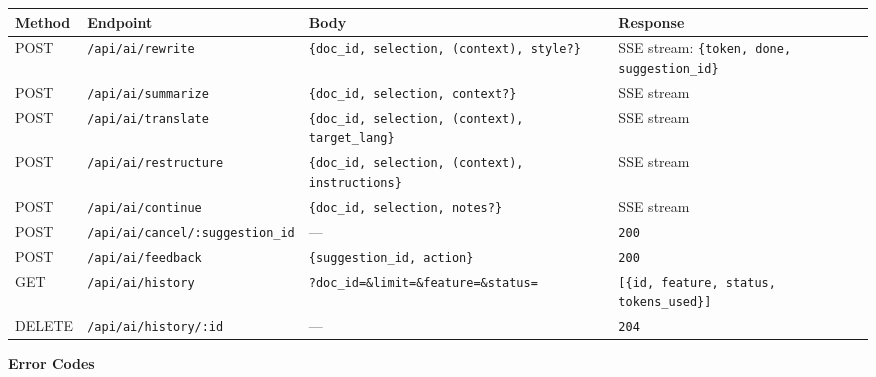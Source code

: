 \documentclass{article}
\begin{document}
\noindent
{\small
\begin{tabularx}{\textwidth}{|>{\hsize=0.3\hsize\raggedright\arraybackslash}X|>{\hsize=0.7\hsize\raggedright\arraybackslash}X|>{\hsize=0.6\hsize\raggedright\arraybackslash}X|>{\hsize=0.4\hsize\raggedright\arraybackslash}X|}
    \hline
    \rowcolor{tableBlue}
    \textbf{\color{white}Method} &
    \textbf{\color{white}Endpoint} &
    \textbf{\color{white}Body} &
    \textbf{\color{white}Response} \\
    \hline
    POST & \texttt{/api/ai/rewrite} & \texttt{\{doc\_id, selection, (context), style?\}} & SSE stream: \texttt{\{token, done, suggestion\_id\}} \\
    \hline
    POST & \texttt{/api/ai/summarize} & \texttt{\{doc\_id, selection, context?\}} & SSE stream \\
    \hline
    POST & \texttt{/api/ai/translate} & \texttt{\{doc\_id, selection, (context), target\_lang\}} & SSE stream \\
    \hline
    POST & \texttt{/api/ai/restructure} & \texttt{\{doc\_id, selection, (context), instructions\}} & SSE stream \\
    \hline
    POST & \texttt{/api/ai/continue} & \texttt{\{doc\_id, selection, notes?\}} & SSE stream \\
    \hline
    POST & \texttt{/api/ai/cancel/:suggestion\_id} & — & \texttt{200} \\
    \hline
    POST & \texttt{/api/ai/feedback} & \texttt{\{suggestion\_id, action\}} & \texttt{200} \\
    \hline
    GET & \texttt{/api/ai/history} & \texttt{?doc\_id=\&limit=\&feature=\&status=} & \texttt{[\{id, feature, status, tokens\_used\}]} \\
    \hline
    DELETE & \texttt{/api/ai/history/:id} & — & \texttt{204} \\
    \hline
\end{tabularx}
}

\vspace{10pt}
\noindent\textbf{Error Codes}
\vspace{5pt}
\end{document}
